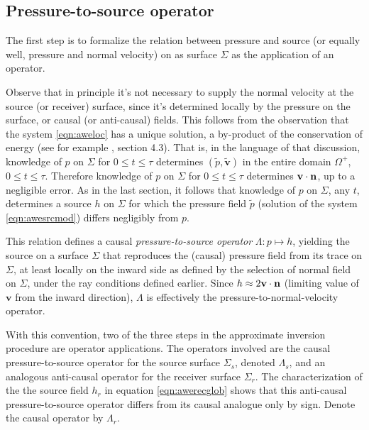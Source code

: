 \documentclass[georeport,12pt]{geophysics}
\newcommand{\bv}{\mathbf{v}}
\begin{document}
\subsection{Pressure-to-source operator}
The first step is to formalize the relation between pressure and
source (or equally well, pressure and normal velocity) on as surface
$\Sigma$ as the application of an operator.

Observe that in principle it's not necessary to
supply the normal velocity at the source (or receiver) surface, since
it's determined locally by the pressure on the surface, or causal (or
anti-causal) fields. This follows from the observation that the system
\ref{eqn:aweloc} has a unique solution, a by-product of the
conservation of energy (see for example \cite{Lax:PDENotes}, section
4.3). That is, in the language of that discussion, knowledge of $p$ on
$\Sigma$ for $0\le t \le \tau$ determines $(\tilde{p},\tilde{\bv})$ in
the entire domain $\Omega^+$, $0\le t \le \tau$. Therefore knowledge
of $p$ on $\Sigma$ for $0\le t \le \tau$ determines
$\bv \cdot {\bf n}$, up to a negligible error. As in the last section,
it follows that knowledge of $p$ on $\Sigma$, any $t$, determines a
source $h$ on $\Sigma$ for which the pressure field $\tilde{p}$
(solution of the system \ref{eqn:awesrcmod}) differs negligibly from
$p$.

This relation defines a causal {\em pressure-to-source operator}
$\Lambda: p \mapsto h$, yielding the source on a surface $\Sigma$ that
reproduces the (causal) pressure field from its trace on $\Sigma$, at
least locally on the inward side as defined by the selection of normal
field on $\Sigma$, under the ray conditions defined earlier. Since
$h \approx 2 \bv \cdot {\bf n}$ (limiting value of $\bv$ from the
inward direction), $\Lambda$ is effectively the
pressure-to-normal-velocity operator.

With this convention, two of the three steps in
the approximate inversion procedure are operator applications. The
operators involved are the causal pressure-to-source operator for the
source surface $\Sigma_s$, denoted $\Lambda_s$, and an analogous
anti-causal operator for the receiver surface $\Sigma_r$. 
The characterization of the the source field $h_r$ in equation
\ref{eqn:awerecglob} shows that this anti-causal pressure-to-source
operator differs from its causal analogue only by sign. Denote the
causal operator by $\Lambda_r$.
\end{document}

